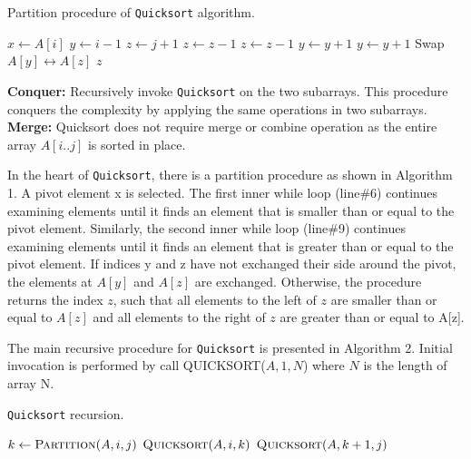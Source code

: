 \documentclass[a4paper, 10pt, twocolumn]{article}
\begin{document}
\begin{algorithm}
\caption{Partition procedure of \texttt{Quicksort} algorithm.}
\begin{algorithmic}[1]
     \newline
        \newline
        \State $x \leftarrow A[i]$
        \State $y \leftarrow i-1$
        \State $z \leftarrow j+1$
            \State $z \leftarrow z-1$
                \State $z \leftarrow z-1$
            \EndWhile
            \State $y \leftarrow y+1$
                \State $y \leftarrow y+1$
            \EndWhile
                \State Swap $A[y] \leftrightarrow A[z]$ 
            \Else 
                \State \Return $z$
            \EndIf 
        \EndWhile
    \EndProcedure 
\end{algorithmic}
\end{algorithm}
\textbf{Conquer:} Recursively invoke \texttt{Quicksort} on the two subarrays. This procedure conquers the complexity by applying the same operations in two subarrays.\\
\textbf{Merge:} Quicksort does not require merge or combine operation as the entire array $A[i..j]$ is sorted in place.\par
In the heart of \texttt{Quicksort}, there is a partition procedure as shown in Algorithm 1. A pivot element x is selected. The first inner while loop (line$\#$6) continues examining elements until it finds an element that is smaller than or equal to the pivot element. Similarly, the second inner while loop (line$\#$9) continues examining elements until it finds an element that is greater than or equal to the pivot element. If indices y and z have not exchanged their side around the pivot, the elements at $A[y]$ and $A[z]$ are exchanged. Otherwise, the procedure returns the index $z$, such that all elements to the left of $z$ are smaller than or equal to $A[z]$ and all elements to the right of $z$ are greater than or equal to A[z].\par
The main recursive procedure for \texttt{Quicksort} is presented in Algorithm 2. Initial invocation is performed by call QUICKSORT($A, 1, N$) where $N$ is the length of array N.

\begin{algorithm}[t]
\caption{\texttt{Quicksort} recursion.}
\begin{algorithmic}[1]
    \newline
            \State $k \leftarrow \Call{Partition}{A,i,j}$ 
            \State $\Call{Quicksort}{A, i, k}$
            \State $\Call{Quicksort}{A,k+1,j}$
        \EndIf 
    \EndProcedure 
\end{algorithmic}
\end{algorithm}
\end{document}
